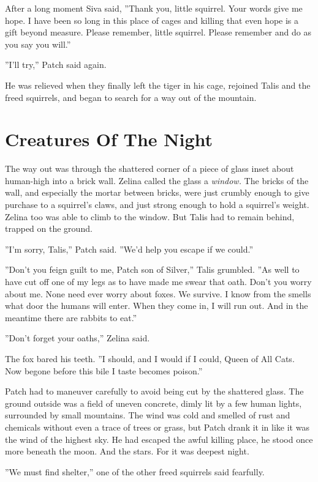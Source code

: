 \documentclass[12pt]{book}
\begin{document}
After a long moment Siva said, ''Thank you, little squirrel. Your
words give me hope. I have been so long in this place of cages and
killing that even hope is a gift beyond measure. Please remember,
little squirrel. Please remember and do as you say you will.''

''I'll try,'' Patch said again.

He was relieved when they finally left the tiger in his cage, rejoined
Talis and the freed squirrels, and began to search for a way out of
the mountain.


\section{Creatures Of The Night}

The way out was through the shattered corner of a piece of glass inset
about human-high into a brick wall. Zelina called the glass a
\textit{window.} The bricks of the wall, and especially the mortar
between bricks, were just crumbly enough to give purchase to a
squirrel's claws, and just strong enough to hold a squirrel's
weight. Zelina too was able to climb to the window. But Talis had to
remain behind, trapped on the ground.

''I'm sorry, Talis,'' Patch said. ''We'd help you escape if we
could.''

''Don't you feign guilt to me, Patch son of Silver,'' Talis
grumbled. ''As well to have cut off one of my legs as to have made me
swear that oath. Don't you worry about me. None need ever worry about
foxes. We survive. I know from the smells what door the humans will
enter. When they come in, I will run out. And in the meantime there
are rabbits to eat.''

''Don't forget your oaths,'' Zelina said.

The fox bared his teeth. ''I should, and I would if I could, Queen of
All Cats. Now begone before this bile I taste becomes poison.''

Patch had to maneuver carefully to avoid being cut by the shattered
glass. The ground outside was a field of uneven concrete, dimly lit by
a few human lights, surrounded by small mountains. The wind was cold
and smelled of rust and chemicals without even a trace of trees or
grass, but Patch drank it in like it was the wind of the highest
sky. He had escaped the awful killing place, he stood once more
beneath the moon. And the stars. For it was deepest night.

''We must find shelter,'' one of the other freed squirrels said
fearfully.
\end{document}
